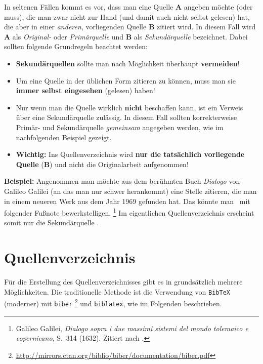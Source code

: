 In seltenen Fällen kommt es vor, dass man eine Quelle \textbf{A} angeben
möchte (oder muss), die man zwar nicht zur Hand (und damit auch nicht selbst
gelesen) hat, die aber in einer \emph{anderen}, vorliegenden Quelle
\textbf{B} zitiert wird. In diesem Fall wird \textbf{A} als \emph{Original-}
oder \emph{Primärquelle} und \textbf{B} als \emph{Sekundärquelle} bezeichnet.
Dabei sollten folgende Grundregeln beachtet werden:
%
\begin{itemize}
    \item
    \textbf{Sekundärquellen} sollte man nach Möglichkeit überhaupt
    \textbf{vermeiden}!
    \item
    Um eine Quelle in der üblichen Form zitieren zu können, muss man sie
    \textbf{immer selbst eingesehen} (gelesen) haben!
    \item
    Nur wenn man die Quelle wirklich \textbf{nicht} beschaffen kann, ist ein
    Verweis über eine Sekundärquelle zulässig. In diesem Fall sollten
    korrekterweise Pri\-mär- und Sekundärquelle \emph{gemeinsam} angegeben
    werden, wie im nachfolgenden Beispiel gezeigt.
    \item
    \textbf{Wichtig:} Ins Quellenverzeichnis wird \textbf{nur die tatsächlich
    vorliegende Quelle} (\textbf{B}) und nicht die Originalarbeit aufgenommen!
\end{itemize}
%
\textbf{Beispiel:} Angenommen man möchte aus dem berühmten Buch \emph{Dialogo}
von Galileo Galilei (an das man nur schwer herankommt) eine Stelle zitieren,
die man in einem neueren Werk aus dem Jahr 1969 gefunden hat. Das könnte man
\zB\ mit folgender Fußnote bewerkstelligen.%
\footnote{Galileo Galilei, \emph{Dialogo sopra i due massimi sistemi del
mondo tolemaico e copernicano}, S.~314 (1632). Zitiert nach
\cite[S.~59]{Hemleben1969}.} %
Im eigentlichen Quellenverzeichnis erscheint somit nur die Sekundärquelle
\cite{Hemleben1969}.


\section{Quellenverzeichnis}


Für die Erstellung des Quellenverzeichnisses gibt es in \latex grundsätzlich
mehrere Möglichkeiten. Die traditionelle Methode ist die Verwendung von
\texttt{BibTeX} \cite{Patashnik1988} \bzw (moderner) mit \texttt{biber}%
\footnote{\url{http://mirrors.ctan.org/biblio/biber/documentation/biber.pdf}}
und \texttt{biblatex}, wie im Folgenden beschrieben.


